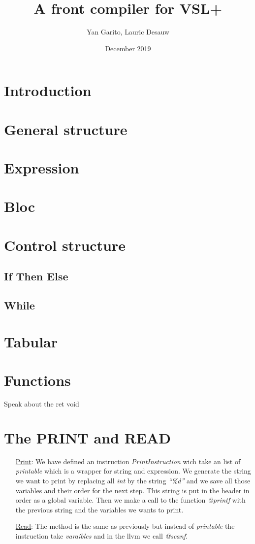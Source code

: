 \documentclass{article}
\title{A front compiler for VSL+}
\author{Yan Garito, Lauric Desauw}
\date{December 2019}
\begin{document}
\maketitle

\section{Introduction}
\section{General structure}
\section{Expression}

\section{Bloc}

\section{Control structure}
\subsection{If Then Else}
\subsection{While}

\section{Tabular}

\section{Functions}
Speak about the ret void 
\section{The PRINT and READ}

\begin{itemize}
\item[\underline{Print}:] We have defined an instruction \emph{PrintInstruction}
  wich take an list of \emph{printable} which is a wrapper for string and
  expression.
  We generate the string we want to print by replacing all \emph{int} by the
  string \emph{``\%d''} and we save all those variables and their order for the next step.
  This string is put in the header in order as a global variable. 
  Then we make a call to the function \emph{@printf} with the previous string and the variables we wants to print. 
\item[\underline{Read}:] The method is the same as previously but instead of
  \emph{printable} the instruction take \emph{varaibles} and in the llvm we call \emph{@scanf}. 
\end{itemize}
\end{document}
